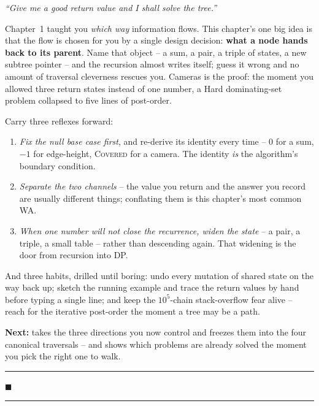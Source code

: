 \begin{lastword}
\emph{``Give me a good return value and I shall solve the tree.''}

\medskip
Chapter~1 taught you \emph{which way} information flows. This chapter's one big idea is
that the flow is chosen for you by a single design decision: \textbf{what a node hands
back to its parent}. Name that object -- a sum, a pair, a triple of states, a new
subtree pointer -- and the recursion almost writes itself; guess it wrong and no amount
of traversal cleverness rescues you. Cameras is the proof: the moment you allowed three
return states instead of one number, a Hard dominating-set problem collapsed to five
lines of post-order.

\medskip
Carry three reflexes forward:
\begin{enumerate}[nosep, leftmargin=1.6em]
  \item \emph{Fix the null base case first}, and re-derive its identity every time --
        $0$ for a sum, $-1$ for edge-height, \textsc{Covered} for a camera. The identity
        \emph{is} the algorithm's boundary condition.
  \item \emph{Separate the two channels} -- the value you return and the answer you
        record are usually different things; conflating them is this chapter's most
        common WA.
  \item \emph{When one number will not close the recurrence, widen the state} -- a pair,
        a triple, a small table -- rather than descending again. That widening is the
        door from recursion into DP.
\end{enumerate}

\medskip
And three habits, drilled until boring: undo every mutation of shared state on the way
back up; sketch the running example and trace the return values by hand before typing a
single line; and keep the $10^5$-chain stack-overflow fear alive -- reach for the
iterative post-order the moment a tree may be a path.

\medskip
\textbf{Next:}  takes the three directions you now control and freezes them
into the four canonical traversals -- and shows which problems are already solved the
moment you pick the right one to walk.

\begin{center}\textcolor{softpurple}{\rule{0.4\linewidth}{0.6pt}\quad $\blacksquare$\quad \rule{0.4\linewidth}{0.6pt}}\end{center}
\end{lastword}
